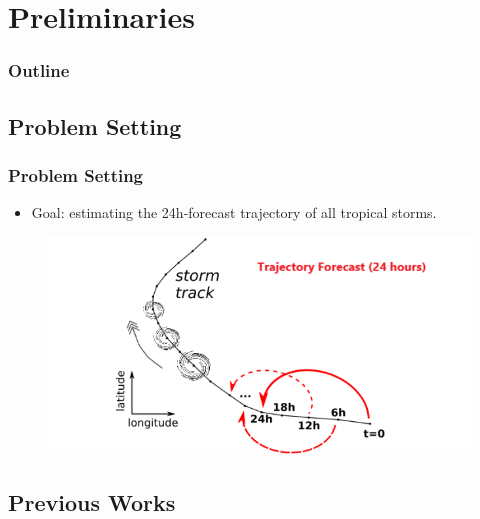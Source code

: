 \documentclass{beamer}
\begin{document}
 
\section{Preliminaries}
\begin{frame}
\frametitle{Outline} %
\tableofcontents[currentsection] %
\end{frame}

\subsection{Problem Setting}
\begin{frame}
\frametitle{Problem Setting}
\begin{itemize}
	\item Goal: estimating the 24h-forecast trajectory of all tropical storms.  \\
\end{itemize}
\begin{figure}
	\includegraphics[width=0.8\linewidth]{figs/storm_shema.png}
\end{figure}
\end{frame}

\subsection{Previous Works}
\end{document}
